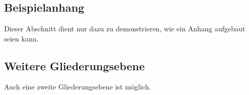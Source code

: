 \documentclass[12pt,oneside,titlepage,listof=totoc,bibliography=totoc]{scrartcl}
\begin{document}
\newpage
\section*{\AppendixName} %

\begin{appendices}
\makeatletter
\renewcommand\@seccntformat[1]{\csname the#1\endcsname:\quad}
\makeatother
{} %
	\renewcommand{\thesection}{\AppendixName\ \arabic{section}}
	\renewcommand\thesubsection{\AppendixName\ \arabic{section}.\arabic{subsection}}

	\section{Beispielanhang}\label{Beispielanhang}
	Dieser Abschnitt dient nur dazu zu demonstrieren, wie ein Anhang aufgebaut seien kann.
	\subsection{Weitere Gliederungsebene}
	Auch eine zweite Gliederungsebene ist möglich.

\end{appendices}


\newpage



\end{document}
